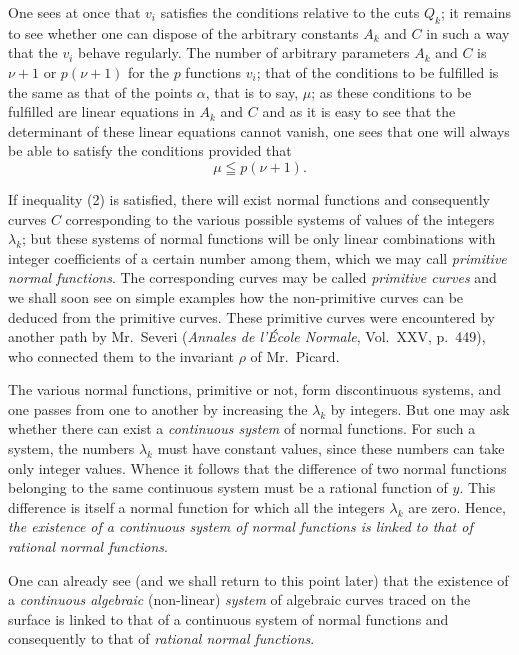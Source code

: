 \documentclass{article}
\begin{document}
One sees at once that $v_{i}$ satisfies the conditions relative to the cuts $Q_{k}$; it remains to see whether one can dispose of the arbitrary constants $A_{k}$ and $C$ in such a way that the $v_{i}$ behave regularly. The number of arbitrary parameters $A_{k}$ and $C$ is $\nu + 1$ or $p(\nu + 1)$ for the $p$ functions $v_{i}$; that of the conditions to be fulfilled is the same as that of the points $\alpha$, that is to say, $\mu$; as these conditions to be fulfilled are linear equations in $A_{k}$ and $C$ and as it is easy to see that the
determinant of these linear equations cannot vanish, one sees that one will always be able to satisfy the conditions provided that
\[
\mu \leqq p(\nu + 1). \tag{2}
\]

If inequality (2) is satisfied, there will exist normal functions and consequently curves $C$ corresponding to the various possible systems of values of the integers $\lambda_{k}$; but these systems of normal functions will be only linear combinations with integer coefficients of a certain number among them, which we may call \emph{primitive normal functions}. The corresponding curves may be called \emph{primitive curves} and we shall soon see on simple examples how the non-primitive curves can be deduced from the primitive curves. These primitive curves were encountered by another path by Mr.~Severi (\emph{Annales de l'École Normale}, Vol.~XXV, p.~449), who connected them to the invariant $\rho$ of Mr.~Picard.

The various normal functions, primitive or not, form discontinuous systems, and one passes from one to another by increasing the $\lambda_{k}$ by integers. But one may ask whether there can exist a \emph{continuous system} of normal functions. For such a system, the numbers $\lambda_{k}$ must have constant values, since these numbers can take only integer values. Whence it follows that the difference of two normal functions belonging to the same continuous system must be a rational function of $y$. This difference is itself a normal function for which all the integers $\lambda_{k}$ are zero. Hence, \emph{the existence of a continuous system of normal functions is linked to that of rational normal functions}.

One can already see (and we shall return to this point later) that the existence of a \emph{continuous algebraic} (non-linear) \emph{system} of algebraic curves traced on the surface is linked to that of a continuous system of normal functions and consequently to that of \emph{rational normal functions}.
\end{document}
